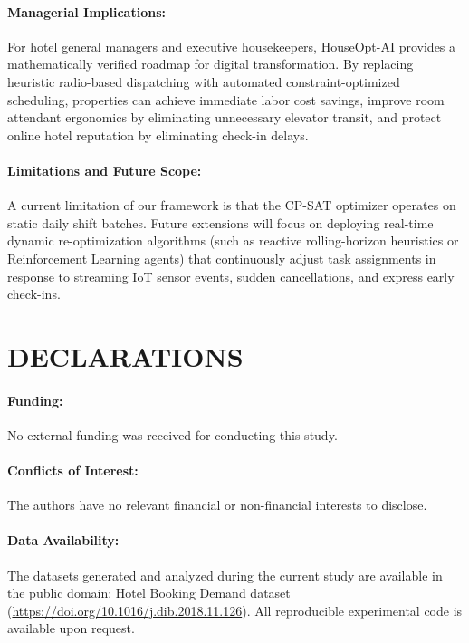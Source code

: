 \documentclass[11pt,a4paper]{article}
\begin{document}
\paragraph{Managerial Implications:} For hotel general managers and executive housekeepers, HouseOpt-AI provides a mathematically verified roadmap for digital transformation. By replacing heuristic radio-based dispatching with automated constraint-optimized scheduling, properties can achieve immediate labor cost savings, improve room attendant ergonomics by eliminating unnecessary elevator transit, and protect online hotel reputation by eliminating check-in delays.

\paragraph{Limitations and Future Scope:} A current limitation of our framework is that the CP-SAT optimizer operates on static daily shift batches. Future extensions will focus on deploying real-time dynamic re-optimization algorithms (such as reactive rolling-horizon heuristics or Reinforcement Learning agents) that continuously adjust task assignments in response to streaming IoT sensor events, sudden cancellations, and express early check-ins.

\section*{DECLARATIONS}

\paragraph{Funding:} No external funding was received for conducting this study.
\paragraph{Conflicts of Interest:} The authors have no relevant financial or non-financial interests to disclose.
\paragraph{Data Availability:} The datasets generated and analyzed during the current study are available in the public domain: Hotel Booking Demand dataset \cite{antonio2019} (\url{https://doi.org/10.1016/j.dib.2018.11.126}). All reproducible experimental code is available upon request.
\end{document}
